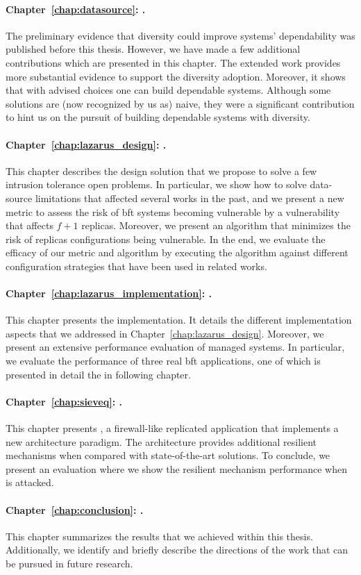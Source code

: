\paragraph{Chapter~\ref{chap:datasource}: .}
The preliminary evidence that diversity could improve systems' dependability was published before this thesis. 
However, we have made a few additional contributions which are presented in this chapter. 
The extended work provides more substantial evidence to support the diversity adoption.
Moreover, it shows that with advised choices one can build dependable systems.
Although some solutions are (now recognized by us as) naive, they were a significant contribution to hint us on the pursuit of building dependable systems with diversity.


\paragraph{Chapter~\ref{chap:lazarus_design}: .}
This chapter describes the design solution that we propose to solve a few intrusion tolerance open problems.
In particular, we show how to solve data-source limitations that affected several works in the past, and we present a new metric to assess the risk of \gls{bft} systems becoming vulnerable by a  vulnerability that affects $f+1$ replicas.
Moreover, we present an algorithm that minimizes the risk of replicas configurations being vulnerable.
In the end, we evaluate the efficacy of our metric and algorithm by executing the algorithm against different configuration strategies that have been used in related works.


\paragraph{Chapter~\ref{chap:lazarus_implementation}: .}
This chapter presents the \system implementation. 
It details the different implementation aspects that we addressed in Chapter~\ref{chap:lazarus_design}. 
Moreover, we present an extensive performance evaluation of \system managed systems.
In particular, we evaluate the performance of three real \gls{bft} applications, one of which is presented in detail the in following chapter.

\paragraph{Chapter~\ref{chap:sieveq}: .}
This chapter presents \sieveq, a firewall-like replicated application that implements a new architecture paradigm.
The \sieveq architecture provides additional resilient mechanisms when compared with state-of-the-art solutions.
To conclude, we present an evaluation where we show the resilient mechanism performance when \sieveq is attacked.



\paragraph{Chapter~\ref{chap:conclusion}: .}
This chapter summarizes the results that we achieved within this thesis.
Additionally, we identify and briefly describe the directions of the work that can be pursued in future research.   


